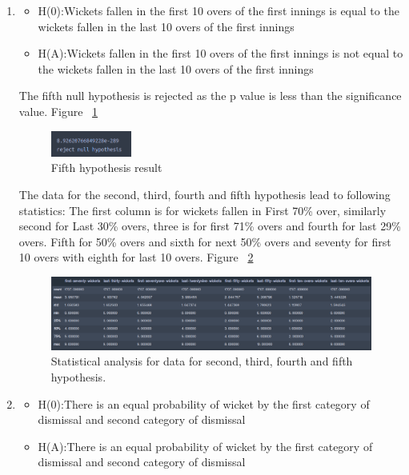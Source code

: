 \documentclass[fleqn,10pt]{wlscirep}
\begin{document}
\begin{enumerate}
\item
\begin{itemize}
    \item H(0):Wickets fallen in the first 10 overs of the first innings is equal to the wickets fallen in the last 10 overs of the first innings
    \item H(A):Wickets fallen in the first 10 overs of the first innings is not equal to the wickets fallen in the last 10 overs of the first innings
\end{itemize}

The fifth null hypothesis is rejected as the p value is less than the significance value. Figure ~\ref{fig:sixteen}
\begin{figure}[H]
    \centering
    \includegraphics[width=0.25\textwidth]{secondfourth.png}
    \caption{Fifth hypothesis result}
    \label{fig:sixteen}
  \end{figure}

  The data for the second, third, fourth and fifth hypothesis lead to following statistics:
  The first column is for wickets fallen in First 70\% over, similarly second for Last  30\% overs, three is for 
  first 71\% overs and fourth for last 29\% overs. Fifth for 50\% overs and sixth for next 50\% overs and seventy for first 10 overs with eighth for last 10 overs.
  Figure ~\ref{fig:seventeen}
\begin{figure}[H]
    \centering
    \includegraphics[width=1\textwidth]{second.png}
    \caption{Statistical analysis for data for second, third, fourth and fifth hypothesis.}
    \label{fig:seventeen}
  \end{figure}

\item
\begin{itemize}
    \item H(0):There is an equal probability of wicket by the first category of dismissal and second category of dismissal
    \item H(A):There is an equal probability of wicket by the first category of dismissal and second category of dismissal
\end{itemize}
 

\end{enumerate}
\end{document}
